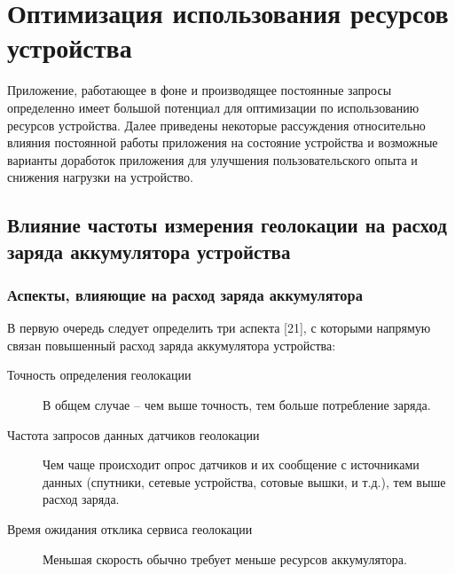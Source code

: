 \chapter{Оптимизация использования ресурсов устройства}
Приложение, работающее в фоне и производящее постоянные запросы определенно имеет большой потенциал для оптимизации по использованию ресурсов устройства. Далее приведены некоторые рассуждения относительно влияния постоянной работы приложения на состояние устройства и возможные варианты доработок приложения для улучшения пользовательского опыта и снижения нагрузки на устройство.

\section{Влияние частоты измерения геолокации на расход заряда аккумулятора устройства}
\subsection*{Аспекты, влияющие на расход заряда аккумулятора}
В первую очередь следует определить три аспекта [21], с которыми напрямую связан повышенный расход заряда аккумулятора устройства:
\begin{description}
	\item[Точность определения геолокации] В общем случае – чем выше точность, тем больше потребление заряда.
	\item[Частота запросов данных датчиков геолокации] Чем чаще происходит опрос датчиков и их сообщение с источниками данных (спутники, сетевые устройства, сотовые вышки, и т.д.), тем выше расход заряда.
	\item[Время ожидания отклика сервиса геолокации] Меньшая скорость обычно требует меньше ресурсов аккумулятора.
\end{description}

